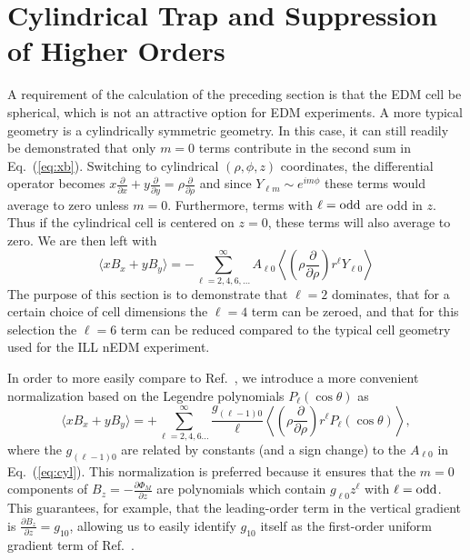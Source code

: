 \documentclass[preprint,12pt]{elsarticle}
\begin{document}
\section{Cylindrical Trap and Suppression of Higher Orders}
\label{sec:cylinder}

A requirement of the calculation of the preceding section is that the
EDM cell be spherical, which is not an attractive option for EDM
experiments.  A more typical geometry is a cylindrically symmetric
geometry.  In this case, it can still readily be demonstrated that
only $m=0$ terms contribute in the second sum in Eq.~(\ref{eq:xb}).
Switching to cylindrical $(\rho,\phi,z)$ coordinates, the differential
operator becomes $x\frac{\partial}{\partial
  x}+y\frac{\partial}{\partial y}=\rho\frac{\partial}{\partial\rho}$
and since $Y_{\ell m}\sim e^{im\phi}$ these terms would average to
zero unless $m=0$.  Furthermore, terms with $\ell={\rm odd}$ are odd
in $z$.  Thus if the cylindrical cell is centered on $z=0$, these
terms will also average to zero.  We are then left with
\begin{equation}
  \label{eq:cyl}
  \langle xB_x+yB_y\rangle=-\sum_{\ell=2,4,6,...}^\infty A_{\ell
    0}\left\langle\left(\rho\frac{\partial}{\partial
    \rho}\right)r^\ell Y_{\ell
    0}\right\rangle
\end{equation}
The purpose of this section is to demonstrate that $\ell=2$ dominates,
that for a certain choice of cell dimensions the $\ell=4$ term can be
zeroed, and that for this selection the $\ell=6$ term can be reduced
compared to the typical cell geometry used for the ILL nEDM
experiment.

In order to more easily compare to Ref.~\cite{bib:pignol-roccia}, we
introduce a more convenient normalization based on the Legendre
polynomials $P_\ell(\cos\theta)$ as
\begin{equation}
\label{eq:cylprime}
  \langle xB_x+yB_y\rangle= +
    \sum_{\ell=2,4,6...}^{\infty}\frac{g_{(\ell-1)0}}{\ell}\left\langle\left(\rho\frac{\partial}{\partial
      \rho}\right)r^\ell P_\ell(\cos\theta)\right\rangle,
\end{equation}
where the $g_{(\ell-1)0}$ are related by constants (and a sign change)
to the $A_{\ell 0}$ in Eq.~(\ref{eq:cyl}).  This normalization is
preferred because it ensures that the $m=0$ components of
$B_{z}=-\frac{\partial\Phi_M}{\partial z}$ are polynomials which
contain $g_{\ell 0}z^\ell$ with $\ell={\rm odd}$.  This guarantees,
for example, that the leading-order term in the vertical gradient is
$\frac{\partial B_z}{\partial z}=g_{10}$, allowing us to easily
identify $g_{10}$ itself as the first-order uniform gradient term of
Ref.~\cite{bib:pignol-roccia}.
\end{document}
